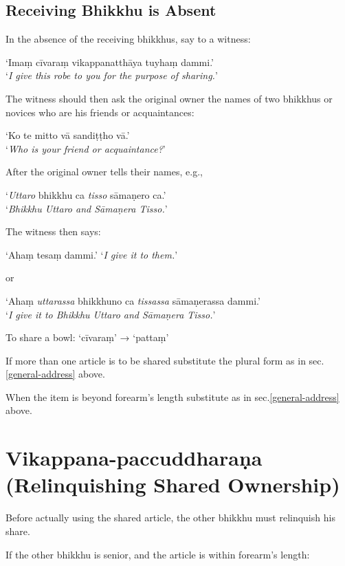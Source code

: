 
\subsection{Receiving Bhikkhu is Absent}
\label{receiving-bhikkhu-absent}

In the absence of the receiving bhikkhus, say to a witness:

‘Imaṃ cīvaraṃ vikappanatthāya tuyhaṃ dammi.’\\
‘\emph{I give this robe to you for the purpose of sharing.}’

The witness should then ask the original owner the names of two bhikkhus or
novices who are his friends or acquaintances:

‘Ko te mitto vā sandiṭṭho vā.’\\
‘\emph{Who is your friend or acquaintance?}’

\ifhandbookedition
\clearpage
\fi

After the original owner tells their names, e.g.,

‘\emph{Uttaro} bhikkhu ca \emph{tisso} sāmaṇero ca.’\\
‘\emph{Bhikkhu Uttaro and Sāmaṇera Tisso.}’

The witness then says:

‘Ahaṃ tesaṃ dammi.’ ‘\emph{I give it to them.}’

or

‘Ahaṃ \emph{uttarassa} bhikkhuno ca \emph{tissassa} sāmaṇerassa dammi.’\\
‘\emph{I give it to Bhikkhu Uttaro and Sāmaṇera Tisso.}’


To share a bowl: ‘cīvaraṃ’ → ‘pattaṃ’

If more than one article is to be shared substitute the plural form as in sec.\ref{general-address} above.

When the item is beyond forearm's length substitute as in sec.\ref{general-address} above.

\section[Vikappana-paccuddharaṇa (Relinquishing)]{Vikappana-paccuddharaṇa (Relinquishing Shared Ownership)}

Before actually using the shared article, the other bhikkhu must relinquish his
share.

If the other bhikkhu is senior, and the article is within forearm's length:

